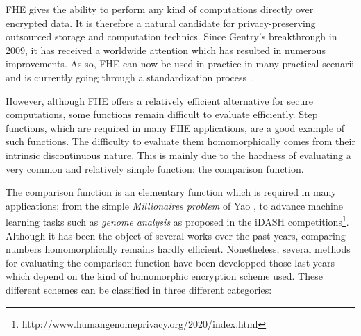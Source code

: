 \ac{FHE} gives the ability to perform any kind of computations directly over encrypted data. It is therefore a natural candidate for privacy-preserving outsourced storage and computation technics. Since Gentry's breakthrough in 2009, it has received a worldwide attention which has resulted in numerous improvements. As so, \ac{FHE} can now be used in practice in many practical scenarii  and is currently going through a standardization process \cite{HomomorphicEncryptionSecurityStandard}.

However, although \ac{FHE} offers a relatively efficient alternative for secure computations, some functions remain difficult to evaluate efficiently. Step functions, which are required in many \ac{FHE} applications, are a good example of such functions. The difficulty to evaluate them homomorphically comes from their intrinsic discontinuous nature. This is mainly due to the hardness of evaluating a very common and relatively simple function: the comparison function.

The comparison function is an elementary function which is required in many applications; from the simple \emph{Millionaires problem} of Yao \cite{Yao82}, to advance machine learning tasks such as \emph{genome analysis} as proposed in the iDASH competitions\footnote{http://www.humangenomeprivacy.org/2020/index.html}. Although it has been the object of several works over the past years, comparing numbers homomorphically remains hardly efficient. Nonetheless, several methods for evaluating the comparison function have been developped those last years which depend on the kind of homomorphic encryption scheme used. These different schemes can be classified in three different categories:

